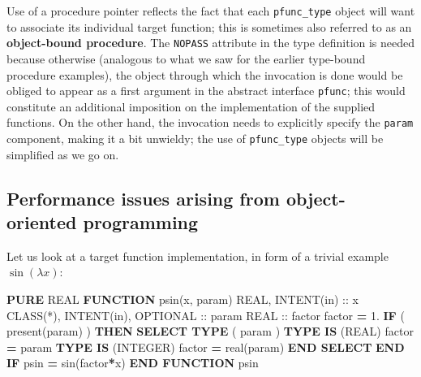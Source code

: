 \documentclass[
]{scrartcl}
\newenvironment{Shaded}{}{}
\newcommand{\BuiltInTok}[1]{\textcolor[rgb]{0.00,0.50,0.00}{#1}}
\newcommand{\DataTypeTok}[1]{\textcolor[rgb]{0.56,0.13,0.00}{#1}}
\newcommand{\FloatTok}[1]{\textcolor[rgb]{0.25,0.63,0.44}{#1}}
\newcommand{\FunctionTok}[1]{\textcolor[rgb]{0.02,0.16,0.49}{#1}}
\newcommand{\KeywordTok}[1]{\textcolor[rgb]{0.00,0.44,0.13}{\textbf{#1}}}
\newcommand{\NormalTok}[1]{#1}
\begin{document}
Use of a procedure pointer reflects the fact that each
\texttt{pfunc\_type} object will want to associate its individual target
function; this is sometimes also referred to as an \textbf{object-bound
procedure}. The \texttt{NOPASS} attribute in the type definition is
needed because otherwise (analogous to what we saw for the earlier
type-bound procedure examples), the object through which the invocation
is done would be obliged to appear as a first argument in the abstract
interface \texttt{pfunc}; this would constitute an additional imposition
on the implementation of the supplied functions. On the other hand, the
invocation needs to explicitly specify the \texttt{param} component,
making it a bit unwieldy; the use of \texttt{pfunc\_type} objects will
be simplified as we go on.

\subsection{Performance issues arising from object-oriented
programming}\label{performance-issues-arising-from-object-oriented-programming}

Let us look at a target function implementation, in form of a trivial
example \(\sin(\lambda x)\):

\begin{Shaded}
\begin{Highlighting}[]
\KeywordTok{PURE} \DataTypeTok{REAL} \KeywordTok{FUNCTION}\NormalTok{ psin(x, param)}
   \DataTypeTok{REAL}\NormalTok{, }\DataTypeTok{INTENT(in)} \DataTypeTok{::}\NormalTok{ x}
   \DataTypeTok{CLASS(*)}\NormalTok{, }\DataTypeTok{INTENT(in)}\NormalTok{, }\DataTypeTok{OPTIONAL} \DataTypeTok{::}\NormalTok{ param}
   \DataTypeTok{REAL} \DataTypeTok{::}\NormalTok{ factor}
\NormalTok{   factor }\KeywordTok{=} \FloatTok{1.}
   \KeywordTok{IF}\NormalTok{ ( }\FunctionTok{present}\NormalTok{(param) ) }\KeywordTok{THEN}
      \KeywordTok{SELECT TYPE}\NormalTok{ ( param )}
      \KeywordTok{TYPE IS}\NormalTok{ (}\DataTypeTok{REAL}\NormalTok{)}
\NormalTok{         factor }\KeywordTok{=}\NormalTok{ param}
      \KeywordTok{TYPE IS}\NormalTok{ (}\DataTypeTok{INTEGER}\NormalTok{)}
\NormalTok{         factor }\KeywordTok{=} \DataTypeTok{real(param)}
      \KeywordTok{END SELECT}
   \KeywordTok{END IF}
\NormalTok{   psin }\KeywordTok{=} \BuiltInTok{sin}\NormalTok{(factor}\KeywordTok{*}\NormalTok{x)}
\KeywordTok{END FUNCTION}\NormalTok{ psin}
\end{Highlighting}
\end{Shaded}
\end{document}
